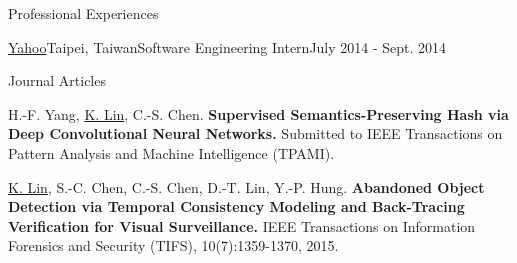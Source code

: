 \documentclass{resume} %
\begin{document}
\begin{rSection}{Professional Experiences}
\begin{mySubsection}{\href{http://tw.yahoo.com}{Yahoo}}{Taipei, Taiwan}{Software Engineering Intern}{July 2014 - Sept. 2014}
\end{mySubsection}



\end{rSection}


\begin{rSection}{Journal Articles}
\begin{myPublication}
\item H.-F. Yang, \underline{K. Lin}, C.-S. Chen. \textbf{Supervised Semantics-Preserving
Hash via Deep Convolutional Neural Networks.}
Submitted to IEEE Transactions on Pattern Analysis and Machine Intelligence (TPAMI).


\item \underline{K. Lin}, S.-C. Chen, C.-S. Chen, D.-T. Lin, Y.-P. Hung. \textbf{Abandoned Object Detection via Temporal Consistency Modeling and Back-Tracing Verification for Visual Surveillance.} IEEE Transactions on Information Forensics and Security (TIFS), 10(7):1359-1370, 2015.
   
\end{myPublication}
\end{rSection}
\end{document}
